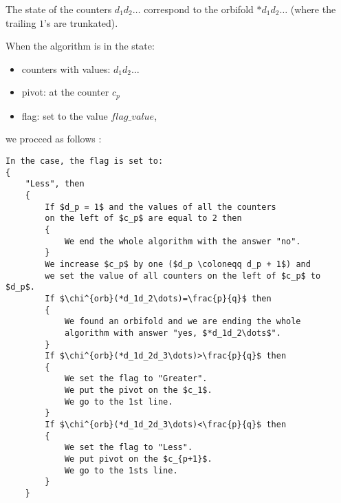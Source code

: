 The state of the counters $d_1d_2\dots$ correspond to the orbifold 
$*d_1d_2\dots$ (where the trailing $1$'s are trunkated). 

When the algorithm is in the state: 
\begin{itemize}
\item counters with values: $d_1d_2\dots$
\item pivot: at the counter $c_p$
\item flag: set to the value $flag\_value$,
\end{itemize}
we procced as follows 
:
\begin{lstlisting}[firstnumber=1,consecutivenumbers=true]
In the case, the flag is set to: 
{
    "Less", then 
    {
        If $d_p = 1$ and the values of all the counters 
        on the left of $c_p$ are equal to 2 then 
        {
            We end the whole algorithm with the answer "no".
        }
        We increase $c_p$ by one ($d_p \coloneqq d_p + 1$) and
        we set the value of all counters on the left of $c_p$ to $d_p$.
        If $\chi^{orb}(*d_1d_2\dots)=\frac{p}{q}$ then
        {
            We found an orbifold and we are ending the whole
            algorithm with answer "yes, $*d_1d_2\dots$".
        }
        If $\chi^{orb}(*d_1d_2d_3\dots)>\frac{p}{q}$ then  
        {
            We set the flag to "Greater".
            We put the pivot on the $c_1$. 
            We go to the 1st line.
        } 
        If $\chi^{orb}(*d_1d_2d_3\dots)<\frac{p}{q}$ then
        {
            We set the flag to "Less".
            We put pivot on the $c_{p+1}$.
            We go to the 1sts line.
        } 
    }


\end{lstlisting}
